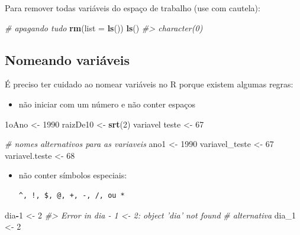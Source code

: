 \documentclass[]{book}
\newenvironment{Shaded}{\begin{snugshade}}{\end{snugshade}}
\newcommand{\KeywordTok}[1]{\textcolor[rgb]{0.13,0.29,0.53}{\textbf{#1}}}
\newcommand{\DataTypeTok}[1]{\textcolor[rgb]{0.13,0.29,0.53}{#1}}
\newcommand{\DecValTok}[1]{\textcolor[rgb]{0.00,0.00,0.81}{#1}}
\newcommand{\StringTok}[1]{\textcolor[rgb]{0.31,0.60,0.02}{#1}}
\newcommand{\CommentTok}[1]{\textcolor[rgb]{0.56,0.35,0.01}{\textit{#1}}}
\newcommand{\OperatorTok}[1]{\textcolor[rgb]{0.81,0.36,0.00}{\textbf{#1}}}
\newcommand{\NormalTok}[1]{#1}
\providecommand{\tightlist}{%
  \setlength{\itemsep}{0pt}\setlength{\parskip}{0pt}}
\begin{document}
Para remover todas variáveis do espaço de trabalho (use com cautela):

\begin{Shaded}
\begin{Highlighting}[]
\CommentTok{# apagando tudo}
\KeywordTok{rm}\NormalTok{(}\DataTypeTok{list =} \KeywordTok{ls}\NormalTok{())}
\KeywordTok{ls}\NormalTok{()}
\CommentTok{#> character(0)}
\end{Highlighting}
\end{Shaded}

\subsection{Nomeando variáveis}\label{nomeando-variaveis}

É preciso ter cuidado ao nomear variáveis no R porque existem algumas
regras:

\begin{itemize}
\tightlist
\item
  não iniciar com um número e não conter espaços
\end{itemize}

\begin{Shaded}
\begin{Highlighting}[]
\NormalTok{1oAno <-}\StringTok{ }\DecValTok{1990}
\NormalTok{raizDe10 <-}\StringTok{ }\KeywordTok{srt}\NormalTok{(}\DecValTok{2}\NormalTok{)}
\NormalTok{variavel teste <-}\StringTok{ }\DecValTok{67}
\end{Highlighting}
\end{Shaded}

\begin{Shaded}
\begin{Highlighting}[]
\CommentTok{# nomes alternativos para as variaveis}
\NormalTok{ano1 <-}\StringTok{ }\DecValTok{1990}
\NormalTok{variavel_teste <-}\StringTok{ }\DecValTok{67}
\NormalTok{variavel.teste <-}\StringTok{ }\DecValTok{68}
\end{Highlighting}
\end{Shaded}

\begin{itemize}
\item
  não conter símbolos especiais:

\begin{verbatim}
^, !, $, @, +, -, /, ou *
\end{verbatim}
\end{itemize}

\begin{Shaded}
\begin{Highlighting}[]
\NormalTok{dia}\OperatorTok{-}\DecValTok{1}\NormalTok{ <-}\StringTok{ }\DecValTok{2}
\CommentTok{#> Error in dia - 1 <- 2: object 'dia' not found}
\CommentTok{# alternativa}
\NormalTok{dia_}\DecValTok{1}\NormalTok{ <-}\StringTok{ }\DecValTok{2}
\end{Highlighting}
\end{Shaded}
\end{document}
